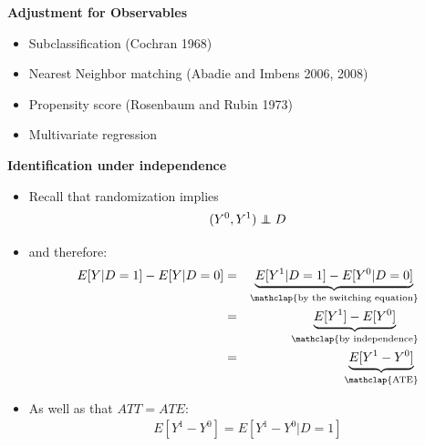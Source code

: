 \documentclass[notes=show]{beamer}
\newcommand\independent{\protect\mathpalette{\protect\independenT}{\perp}}
\def\independenT#1#2{\mathrel{\rlap{$#1#2$}\mkern2mu{#1#2}}}
\begin{document}
\begin{frame}[plain]
	\begin{center}
	\textbf{Adjustment for Observables}
	\end{center}
	
	\begin{itemize}
	\item Subclassification (Cochran 1968)
	\item Nearest Neighbor matching (Abadie and Imbens 2006, 2008)
	\item Propensity score  (Rosenbaum and Rubin 1973)
	\item Multivariate regression
	\end{itemize}
\end{frame}


\begin{frame}[plain]
	\begin{center}
	\textbf{Identification under independence}
	\end{center}
	
	\begin{itemize}
	\item Recall that randomization implies$$(Y^0,Y^1)\independent{D}$$
	\item and therefore:
		\begin{eqnarray*}
		E[Y|D=1] - E[Y|D=0] &=& \underbrace{E[Y^1|D=1] - E[Y^0|D=0]}_{\mathclap{\text{by the switching equation}}} \\
		&=& \underbrace{E[Y^1] - E[Y^0]}_{\mathclap{\text{by independence}}} \\
		&=& \underbrace{E[Y^1-Y^0]}_{\mathclap{\text{ATE}}}
		\end{eqnarray*}
	\item As well as that $ATT=ATE$:
		\begin{eqnarray*}
		E[Y^1-Y^0] = E[Y^1 - Y^0 | D=1]
		\end{eqnarray*}
	\end{itemize}
\end{frame}
\end{document}
